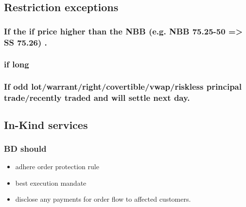 \documentclass[11pt]{article}
\begin{document}
\subsection{Restriction exceptions}
\label{sec:org2ea7f4c}
\subsubsection{If the if price  higher than the NBB  (e.g. NBB 75.25-50 => SS 75.26) .}
\label{sec:org7f93e8c}
\subsubsection{if long}
\label{sec:org34f9fa4}
\subsubsection{If odd lot/warrant/right/covertible/vwap/riskless principal trade/recently traded and will settle next day.}
\label{sec:org917a697}

\subsection{In-Kind services}
\label{sec:orgb9bd658}
\subsubsection{BD should}
\label{sec:orgdf2796d}
\begin{itemize}
\item adhere order protection rule
\item best execution mandate
\item disclose any payments for order flow to affected customers.
\end{itemize}
\end{document}
